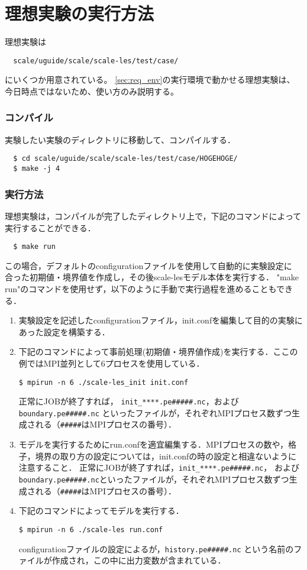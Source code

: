 \section{理想実験の実行方法}
理想実験は
\begin{verbatim}
  scale/uguide/scale/scale-les/test/case/
\end{verbatim}
にいくつか用意されている。
\ref{sec:req_env}の実行環境で動かせる理想実験は、
今日時点ではないため、使い方のみ説明する。


\subsubsection{コンパイル}
実験したい実験のディレクトリに移動して、コンパイルする．
\begin{verbatim}
  $ cd scale/uguide/scale/scale-les/test/case/HOGEHOGE/
  $ make -j 4
\end{verbatim}

\subsubsection{実行方法}
理想実験は，コンパイルが完了したディレクトリ上で，下記のコマンドによって
実行することができる．
\begin{verbatim}
  $ make run
\end{verbatim}
この場合，デフォルトのconfigurationファイルを使用して自動的に実験設定に
合った初期値・境界値を作成し，その後scale-lesモデル本体を実行する．
"make run"のコマンドを使用せず，以下のように手動で実行過程を進めることもできる．

\begin{enumerate}
\item 実験設定を記述したconfigurationファイル，init.confを編集して目的の実験にあった設定を構築する．

\item 下記のコマンドによって事前処理(初期値・境界値作成)を実行する．ここの例ではMPI並列として6プロセスを使用している．
\begin{verbatim}
$ mpirun -n 6 ./scale-les_init init.conf
\end{verbatim}
正常にJOBが終了すれば，
\verb|init_****.pe#####.nc|，および\verb|boundary.pe#####.nc|
といったファイルが，それぞれMPIプロセス数ずつ生成される（\verb|#####|はMPIプロセスの番号）．

\item モデルを実行するためにrun.confを適宜編集する．MPIプロセスの数や，格子，境界の取り方の設定については，init.confの時の設定と相違ないように注意すること．
正常にJOBが終了すれば，\verb|init_****.pe#####.nc|，
および\verb|boundary.pe#####.nc|といったファイルが，それぞれMPIプロセス数ずつ生成される（\verb|#####|はMPIプロセスの番号）．

\item 下記のコマンドによってモデルを実行する．
\begin{verbatim}
$ mpirun -n 6 ./scale-les run.conf
\end{verbatim}
configurationファイルの設定によるが，\verb|history.pe#####.nc|
という名前のファイルが作成され，この中に出力変数が含まれている．
\end{enumerate}

